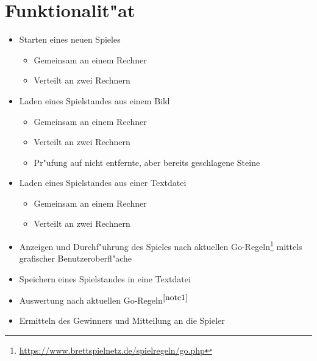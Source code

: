 \documentclass[a4paper]{scrreprt}
\begin{document}
{\chapter{Funktionalit"at}
 
\begin{itemize}
  \item Starten eines neuen Spieles 
      \begin{itemize}
      \item{Gemeinsam an einem Rechner}
      \item{Verteilt an zwei Rechnern}
    \end{itemize}
      \item Laden eines Spielstandes aus einem Bild
      \begin{itemize}
      \item{Gemeinsam an einem Rechner}
      \item{Verteilt an zwei Rechnern}
      \item{Pr"ufung auf nicht entfernte, aber bereits geschlagene Steine}
    \end{itemize}
    \item Laden eines Spielstandes aus einer Textdatei
      \begin{itemize}
      \item{Gemeinsam an einem Rechner}
      \item{Verteilt an zwei Rechnern}
    \end{itemize}
      \item Anzeigen und Durchf"uhrung des Spieles nach aktuellen Go-Regeln\footnote{\label{note1}{\url{https://www.brettspielnetz.de/spielregeln/go.php}}} mittels grafischer Benutzeroberfl"ache 
    \item Speichern eines Spielstandes in eine Textdatei
    \item Auswertung nach aktuellen Go-Regeln$^{\ref{note1}}$
    \item Ermitteln des Gewinners und Mitteilung an die Spieler
\end{itemize}
 
}
\end{document}
